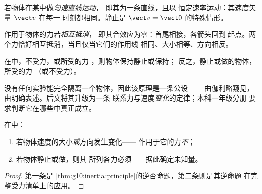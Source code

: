 \begin{definition}[匀速直线运动]\label{def:g10:inertia:uniform}
若物体在某中做\emph{匀速直线运动}，
即其为一条直线，且以
恒定速率运动：其速度矢量 $\vect v$ 在每一
时刻都相同。静止是 $\vect v = \vect 0$ 的特殊情形。
\end{definition}

\begin{definition}[相互抵消的力]\label{def:g10:inertia:compensate}
作用于物体的力若\emph{相互抵消}，
即其合效应为零：首尾相接，各箭头回到
起点。两个力恰好相互抵消，当且仅当它们的作用线
相同、大小相等、方向相反。
\end{definition}

\begin{theorem}[惯性原理]\label{thm:g10:inertia:principle}
在中，不受力，或所受的力
，则物体保持静止或保持；
反之，静止或做的物体，所受的力
（或不受力）。
\end{theorem}
\admitted

\begin{remark}
没有任何实验能完全隔离一个物体，因此该原理是一条公设
——由伽利略窥见，由明确表述。后文将其升级为一条
联系力与速度\emph{变化}的定律；本科一年级分册
要求判断它在哪些中真正成立。
\end{remark}

\begin{proposition}\label{prop:g10:inertia:converse}
在中：
\begin{enumerate}
  \item 若物体速度的大小\emph{或}方向发生变化——
        作用于它的力\emph{不}；
  \item 若物体静止或做，则其
        所列各力必须——据此确定未知量。
\end{enumerate}
\end{proposition}

\begin{proof}
第一条是
\cref{thm:g10:inertia:principle}的逆否命题，第二条则是其逆命题
在完整受力清单上的应用。
\end{proof}

